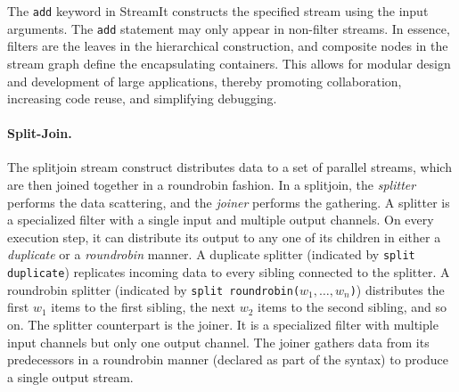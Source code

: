 The {\tt add} keyword in StreamIt constructs the specified stream
using the input arguments. The {\tt add} statement may only appear in
non-filter streams.  In essence, filters are the leaves in the
hierarchical construction, and composite nodes in the stream graph
define the encapsulating containers. This allows for modular design
and development of large applications, thereby  promoting
collaboration, increasing code reuse, and simplifying debugging.

\paragraph{Split-Join.}
The splitjoin stream construct distributes data to a set of parallel
streams, which are then joined together in a roundrobin fashion. In a
splitjoin, the {\it splitter} performs the data scattering, and the
{\it joiner} performs the gathering. A splitter is a specialized
filter with a single input and multiple output channels. On every
execution step, it can distribute its output to any one of its
children in either a {\it duplicate} or a {\it roundrobin} manner.  A
duplicate splitter (indicated by \texttt{split duplicate}) replicates
incoming data to every sibling connected to the splitter.  A
roundrobin splitter (indicated by {\tt split
roundrobin($w_1,\ldots,w_n$)}) distributes the first $w_1$ items to
the first sibling, the next $w_2$ items to the second sibling, and so
on.  The splitter counterpart is the joiner. It is a specialized
filter with multiple input channels but only one output channel. The
joiner gathers data from its predecessors in a roundrobin manner
(declared as part of the syntax) to produce a single output stream.

      
        
        
